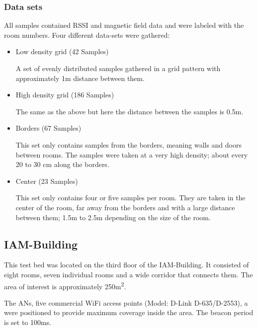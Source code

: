 \subsubsection{Data sets}
All samples contained RSSI and magnetic field data and were labeled with the room numbers. Four different data-sets were gathered:
\begin{itemize}
\item Low density grid (42 Samples)

A set of evenly distributed samples gathered in a grid pattern with approximately 1m distance between them.

\item High density grid (186 Samples)

The same as the above but here the distance between the samples is 0.5m.
\item Borders (67 Samples)

This set only contains samples from the borders, meaning walls and doors between rooms. The samples were taken at a very high density; about every 20 to 30 cm along the borders.
\item Center (23 Samples)

This set only contains four or five samples per room. They are taken in the center of the room, far away from the borders and with a large distance between them; 1.5m to 2.5m depending on the size of the room.
\end{itemize}


\subsection{IAM-Building}
This test bed was located on the third floor of the IAM-Building. It consisted of eight rooms, seven individual rooms and a wide corridor that connects them. The area of interest is approximately 250m\textsuperscript{2}.

The ANs, five commercial WiFi access points (Model: D-Link D-635/D-2553), a were positioned to provide maximum coverage inside the area. The beacon period is set to 100ms.



